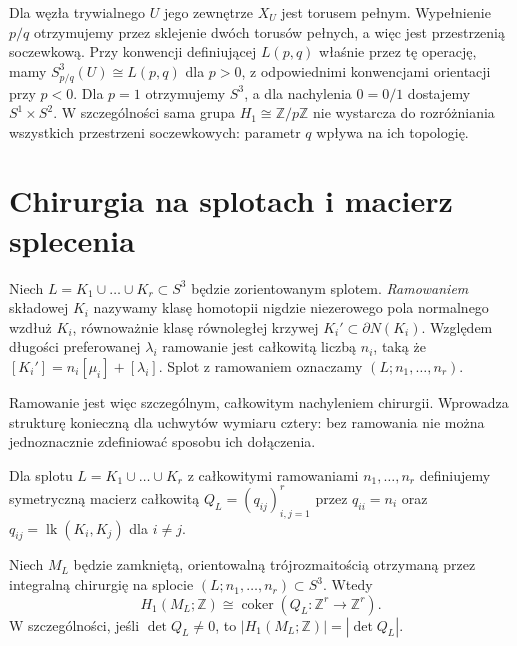 \begin{przyklad}
Dla węzła trywialnego $U$ jego zewnętrze $X_U$
jest torusem pełnym. Wypełnienie $p/q$ otrzymujemy
przez sklejenie dwóch torusów pełnych, a więc jest
przestrzenią soczewkową. Przy konwencji definiującej
$L(p,q)$ właśnie przez tę operację, mamy
$S^3_{p/q}(U)\cong L(p,q)$ dla $p>0$, z odpowiednimi
konwencjami orientacji przy $p<0$. Dla $p=1$ otrzymujemy
$S^3$, a dla nachylenia $0=0/1$ dostajemy $S^1\times S^2$.
W szczególności sama grupa $H_1\cong\mathbb Z/p\mathbb Z$
nie wystarcza do rozróżniania wszystkich przestrzeni
soczewkowych: parametr $q$ wpływa na ich topologię.
\end{przyklad}

\section{Chirurgia na splotach i macierz splecenia}
\label{sec:kt-chirurgia-link}

\begin{definicja}
Niech $L=K_1\cup\dots\cup K_r\subset S^3$ będzie
zorientowanym splotem. \emph{Ramowaniem} składowej $K_i$
nazywamy klasę homotopii nigdzie niezerowego pola normalnego
wzdłuż $K_i$, równoważnie klasę równoległej krzywej
$K_i'\subset\partial N(K_i)$. Względem długości preferowanej
$\lambda_i$ ramowanie jest całkowitą liczbą $n_i$, taką że
$[K_i']=n_i[\mu_i]+[\lambda_i]$.
Splot z ramowaniem oznaczamy $(L;n_1,\dots,n_r)$.
\end{definicja}

Ramowanie jest więc szczególnym, całkowitym nachyleniem
chirurgii. Wprowadza strukturę konieczną dla uchwytów
wymiaru cztery: bez ramowania nie można jednoznacznie
zdefiniować sposobu ich dołączenia.

\begin{definicja}
Dla splotu $L=K_1\cup\dots\cup K_r$ z całkowitymi
ramowaniami $n_1,\dots,n_r$ definiujemy symetryczną
macierz całkowitą $Q_L=(q_{ij})_{i,j=1}^r$ przez
$q_{ii}=n_i$ oraz $q_{ij}=\operatorname{lk}(K_i,K_j)$
dla $i\ne j$.
\end{definicja}

\begin{twierdzenie}
Niech $M_L$ będzie zamkniętą, orientowalną trójrozmaitością
otrzymaną przez integralną chirurgię na splocie
$(L;n_1,\ldots,n_r)\subset S^3$. Wtedy
\[
H_1(M_L;\mathbb Z)\cong\operatorname{coker}
(Q_L:\mathbb Z^r\longrightarrow\mathbb Z^r).
\]
W szczególności, jeśli $\det Q_L\ne0$, to
$|H_1(M_L;\mathbb Z)|=|\det Q_L|$.
\end{twierdzenie}

